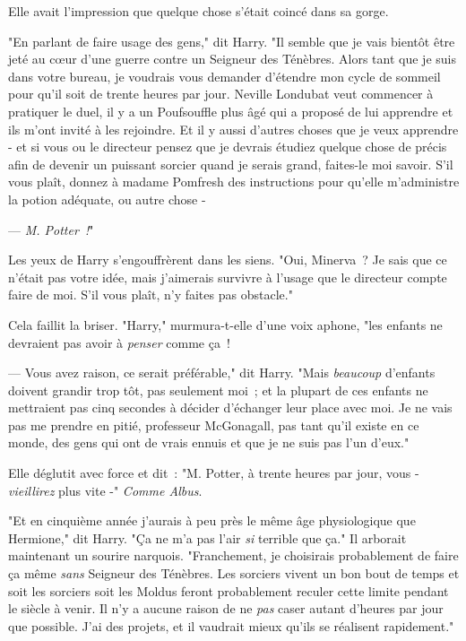 Elle avait l'impression que quelque chose s'était coincé dans sa gorge.

"En parlant de faire usage des gens," dit Harry. "Il semble que je vais bientôt être jeté au cœur d'une guerre contre un Seigneur des Ténèbres. Alors tant que je suis dans votre bureau, je voudrais vous demander d'étendre mon cycle de sommeil pour qu'il soit de trente heures par jour. Neville Londubat veut commencer à pratiquer le duel, il y a un Poufsouffle plus âgé qui a proposé de lui apprendre et ils m'ont invité à les rejoindre. Et il y aussi d'autres choses que je veux apprendre - et si vous ou le directeur pensez que je devrais étudiez quelque chose de précis afin de devenir un puissant sorcier quand je serais grand, faites-le moi savoir. S'il vous plaît, donnez à madame Pomfresh des instructions pour qu'elle m'administre la potion adéquate, ou autre chose -

--- \emph{M. Potter~!}"

Les yeux de Harry s'engouffrèrent dans les siens. "Oui, Minerva~? Je sais que ce n'était pas votre idée, mais j'aimerais survivre à l'usage que le directeur compte faire de moi. S'il vous plaît, n'y faites pas obstacle."

Cela faillit la briser. "Harry," murmura-t-elle d'une voix aphone, "les enfants ne devraient pas avoir à \emph{penser} comme ça~!

--- Vous avez raison, ce serait préférable," dit Harry. "Mais \emph{beaucoup} d'enfants doivent grandir trop tôt, pas seulement moi~; et la plupart de ces enfants ne mettraient pas cinq secondes à décider d'échanger leur place avec moi. Je ne vais pas me prendre en pitié, professeur McGonagall, pas tant qu'il existe en ce monde, des gens qui ont de vrais ennuis et que je ne suis pas l'un d'eux."

Elle déglutit avec force et dit~: "M. Potter, à trente heures par jour, vous - \emph{vieillirez} plus vite -" \emph{Comme Albus}.

"Et en cinquième année j'aurais à peu près le même âge physiologique que Hermione," dit Harry. "Ça ne m'a pas l'air \emph{si} terrible que ça." Il arborait maintenant un sourire narquois. "Franchement, je choisirais probablement de faire ça même \emph{sans} Seigneur des Ténèbres. Les sorciers vivent un bon bout de temps et soit les sorciers soit les Moldus feront probablement reculer cette limite pendant le siècle à venir. Il n'y a aucune raison de ne \emph{pas} caser autant d'heures par jour que possible. J'ai des projets, et il vaudrait mieux qu'ils se réalisent rapidement."

